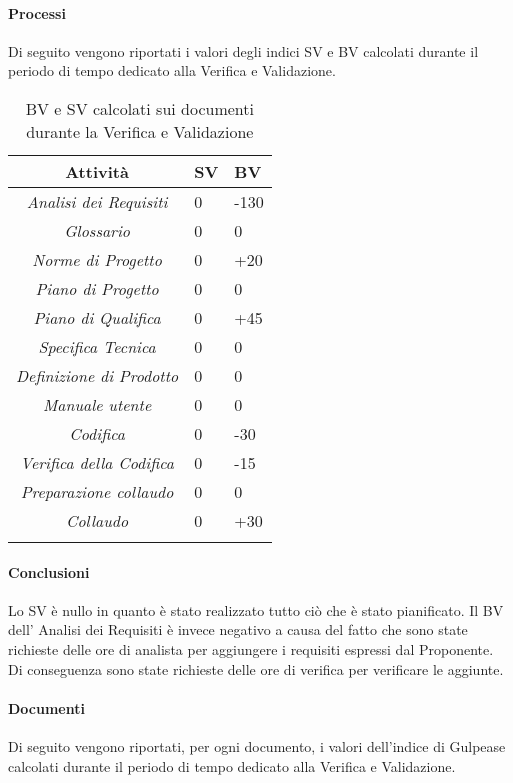 \paragraph{Processi}
Di seguito vengono riportati i valori degli indici SV e BV calcolati durante il periodo di tempo dedicato alla Verifica e Validazione.
\begin{longtable}{|c|p{3cm}|p{3cm}|}
\toprule
\textbf{Attività} & \textbf{SV} & \textbf{BV} \\


\midrule
\emph{Analisi dei Requisiti} & 0 & -130 \\
\midrule
\emph{Glossario} & 0 & 0 \\
\midrule
\emph{Norme di Progetto} & 0 & +20 \\
\midrule
\emph{Piano di Progetto} & 0 & 0 \\
\midrule
\emph{Piano di Qualifica} & 0 & +45 \\
\midrule
\emph{Specifica Tecnica} & 0 & 0 \\
\midrule
\emph{Definizione di Prodotto} & 0 & 0 \\
\midrule
\emph{Manuale utente} & 0 & 0 \\
\midrule
\emph{Codifica} & 0 & -30 \\
\midrule
\emph{Verifica della Codifica} & 0 & -15 \\
\midrule
\emph{Preparazione collaudo} & 0 & 0 \\
\midrule
\emph{Collaudo} & 0 & +30 \\
\bottomrule
\caption{BV e SV calcolati sui documenti durante la Verifica e Validazione}
\label{tab:changelog}
\end{longtable}

\paragraph{Conclusioni}
Lo SV è nullo in quanto è stato realizzato tutto ciò che è stato pianificato.
Il BV dell' Analisi dei Requisiti è invece negativo a causa del fatto che sono state richieste delle ore di analista per aggiungere i requisiti espressi dal Proponente. Di conseguenza sono state richieste delle ore di verifica per verificare le aggiunte.



\paragraph{Documenti}
Di seguito vengono riportati, per ogni documento, i valori dell'indice di Gulpease calcolati durante il periodo di tempo dedicato alla Verifica e Validazione.

